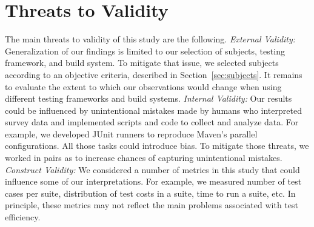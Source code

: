 \section{Threats to Validity}

The main threats to validity of this study are the following.
\textit{External Validity:} Generalization of our findings is limited
to our selection of subjects, testing framework, and build system.  To
mitigate that issue, we selected subjects according to an objective
criteria, described in Section~\ref{sec:subjects}.  It remains to
evaluate the extent to which our observations would change when using
different testing frameworks and build systems.  \textit{Internal
  Validity:} Our results could be influenced by unintentional mistakes
made by humans who interpreted survey data and implemented scripts and
code to collect and analyze data. For example, we developed JUnit
runners to reproduce Maven's parallel configurations.  All those tasks
could introduce bias.  To mitigate those threats, we worked in pairs
as to increase chances of capturing unintentional mistakes.
\textit{Construct Validity:} We considered a number of metrics in this
study that could influence some of our interpretations.  For example,
we measured number of test cases per suite, distribution of test costs
in a suite, time to run a suite, etc.  In principle, these metrics may
not reflect the main problems associated with test
efficiency.


